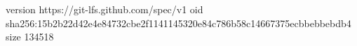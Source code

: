 version https://git-lfs.github.com/spec/v1
oid sha256:15b2b22d42e4e84732cbe2f1141145320e84c786b58c14667375ecbbebbebdb4
size 134518
